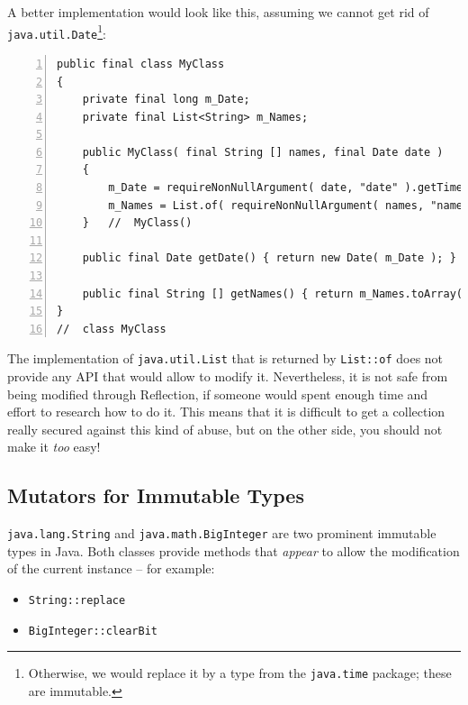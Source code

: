 \documentclass[11pt,a4paper, titlepage, parskip=half, headsepline, footsepline, cleardoublepage=current, headheight=1cm]{scrbook}
\begin{document}
A better implementation would look like this, assuming we cannot get rid of \lstinline|java.util.Date|\footnote{Otherwise, we would replace it by a type from the \lstinline|java.time| package\autocite{ORACLE_DOC_TIME_PACKAGE}; these are immutable.}:
\begin{lstlisting}[numbers=left]
public final class MyClass
{
    private final long m_Date;
    private final List<String> m_Names;
    
    public MyClass( final String [] names, final Date date )
    {
        m_Date = requireNonNullArgument( date, "date" ).getTime();
        m_Names = List.of( requireNonNullArgument( names, "names" ) );
    }   //  MyClass()
    
    public final Date getDate() { return new Date( m_Date ); }
    
    public final String [] getNames() { return m_Names.toArray( String []::new ); }
}
//  class MyClass
\end{lstlisting}
The implementation of \lstinline|java.util.List|\autocite{ORACLE_DOC_LIST_INTERFACE} that is returned by \lstinline|List::of|\autocite{ORACLE_DOC_LIST:of} does not provide any API that would allow to modify it. Nevertheless, it is not safe from being modified through Reflection, if someone would spent enough time and effort to research how to do it. This means that it is difficult to get a collection really secured against this kind of abuse, but on the other side, you should not make it \textit{too} easy!


\subsection{Mutators for Immutable Types}
\lstinline|java.lang.String|\autocite{ORACLE_DOC_STRING_CLASS} and \lstinline|java.math.BigInteger|\autocite{ORACLE_DOC_BIGINTEGER_CLASS} are two prominent immutable types in Java. Both classes provide methods that \textit{appear} to allow the modification of the current instance – for example:
\begin{itemize}[nosep]
\item{\lstinline|String::replace|\autocite{ORACLE_DOC_STRING:replace}}
\item{\lstinline|BigInteger::clearBit|\autocite{ORACLE_DOC_BIGINTEGER:clearBit}}
\end{itemize}
\end{document}
